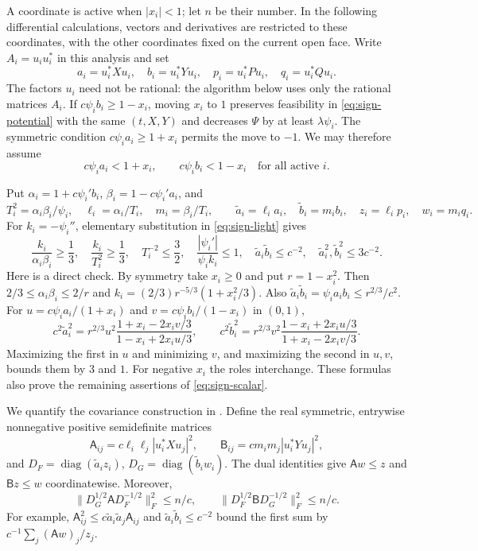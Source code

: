 A coordinate is active when $|x_i|<1$; let $n$ be their number.
In the following differential calculations, vectors and derivatives
are restricted to these coordinates, with the other coordinates fixed
on the current open face.
Write $A_i=u_iu_i^*$ in this analysis and set
\[
 a_i=u_i^*Xu_i,\quad b_i=u_i^*Yu_i,\quad
 p_i=u_i^*Pu_i,\quad q_i=u_i^*Qu_i.
\]
The factors $u_i$ need not be rational: the algorithm below uses only
the rational matrices $A_i$.  If $c\psi_i b_i\ge1-x_i$, moving $x_i$
to $1$ preserves feasibility in \eqref{eq:sign-potential} with the
same $(t,X,Y)$ and decreases $\Psi$ by at least $\lambda\psi_i$.
The symmetric condition $c\psi_i a_i\ge1+x_i$ permits the move to $-1$.
We may therefore assume
\begin{equation}
 c\psi_i a_i<1+x_i,\qquad c\psi_i b_i<1-x_i
 \quad\text{for all active }i.
 \label{eq:sign-light}
\end{equation}

Put $\alpha_i=1+c\psi_i'b_i$, $\beta_i=1-c\psi_i'a_i$, and
\[
 T_i^2=\alpha_i\beta_i/\psi_i,\quad
 \ell_i=\alpha_i/T_i,\quad m_i=\beta_i/T_i,\qquad
 \widetilde a_i=\ell_i a_i,\quad \widetilde b_i=m_i b_i,\quad
 z_i=\ell_i p_i,\quad w_i=m_i q_i.
\]
For $k_i=-\psi_i''$, elementary substitution in
\eqref{eq:sign-light} gives
\begin{equation}
 \frac{k_i}{\alpha_i\beta_i}\ge\frac13,
 \quad\frac{k_i}{T_i^2}\ge\frac13,
 \quad T_i^{-2}\le\frac32,
 \quad\frac{|\psi_i'|}{\psi_i k_i}\le1,
 \quad\widetilde a_i\widetilde b_i\le c^{-2},
 \quad\widetilde a_i^2,\widetilde b_i^2\le3c^{-2}.
 \label{eq:sign-scalar}
\end{equation}
Here is a direct check.  By symmetry take $x_i\ge0$ and put
$r=1-x_i^2$.  Then
$2/3\le\alpha_i\beta_i\le2/r$ and
$k_i=(2/3)r^{-5/3}(1+x_i^2/3)$.
Also $\widetilde a_i\widetilde b_i=\psi_i a_i b_i
\le r^{2/3}/c^2$.  For
$u=c\psi_i a_i/(1+x_i)$ and $v=c\psi_i b_i/(1-x_i)$ in $(0,1)$,
\[
 c^2\widetilde a_i^2
 =r^{2/3}u^2\frac{1+x_i-2x_iv/3}{1-x_i+2x_iu/3},\qquad
 c^2\widetilde b_i^2
 =r^{2/3}v^2\frac{1-x_i+2x_iu/3}{1+x_i-2x_iv/3}.
\]
Maximizing the first in $u$ and minimizing $v$, and maximizing the
second in $u,v$, bounds them by $3$ and $1$.
For negative $x_i$ the roles interchange.  These formulas also prove
the remaining assertions of \eqref{eq:sign-scalar}.

We quantify the covariance construction in
\cite[Lemma~4.5]{EzeunalaJiang2026}.  Define the real symmetric,
entrywise nonnegative positive semidefinite matrices
\[
 \mathsf A_{ij}=c\ell_i\ell_j|u_i^*Xu_j|^2,
 \qquad \mathsf B_{ij}=cm_im_j|u_i^*Yu_j|^2,
\]
and $D_F=\operatorname{diag}(\widetilde a_i z_i)$,
$D_G=\operatorname{diag}(\widetilde b_i w_i)$.
The dual identities give $\mathsf A w\le z$ and
$\mathsf Bz\le w$ coordinatewise.  Moreover,
\[
 \|D_G^{1/2}\mathsf A D_F^{-1/2}\|_F^2\le n/c,
 \qquad
 \|D_F^{1/2}\mathsf B D_G^{-1/2}\|_F^2\le n/c.
\]
For example, $\mathsf A_{ij}^2\le
c\widetilde a_i\widetilde a_j\mathsf A_{ij}$ and
$\widetilde a_i\widetilde b_i\le c^{-2}$ bound the first sum by
$c^{-1}\sum_j(\mathsf A w)_j/z_j$.


